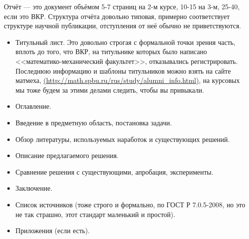 \documentclass[a5paper]{article}
\begin{document}
Отчёт --- это документ объёмом 5-7 страниц на 2-м курсе, 10-15 на 3-м, 25-40, если это ВКР. Структура отчёта довольно типовая, примерно соответствует структуре научной публикации, отступления от неё обычно не приветствуются.
\begin{itemize}
	\item Титульный лист. Это довольно строгая с формальной точки зрения часть, вплоть до того, что ВКР, на титульнике которых было написано <<математико-механический факультет>>, отказывались регистрировать. Последнюю информацию и шаблоны титульников можно взять на сайте матмеха, \url{ (http://math.spbu.ru/rus/study/alumni_info.html)}, на курсовых мы тоже будем за этими делами следить, чтобы вы привыкали.
	\item Оглавление.
	\item Введение в предметную область, постановка задачи.
	\item Обзор литературы, используемых наработок и существующих решений.
	\item Описание предлагаемого решения.
	\item Сравнение решения с существующими, апробация, эксперименты.
	\item Заключение.
	\item Список источников (тоже строго и формально, по ГОСТ Р 7.0.5-2008, но это не так страшно, этот стандарт маленький и простой).
	\item Приложения (если есть).
\end{itemize}
\end{document}
